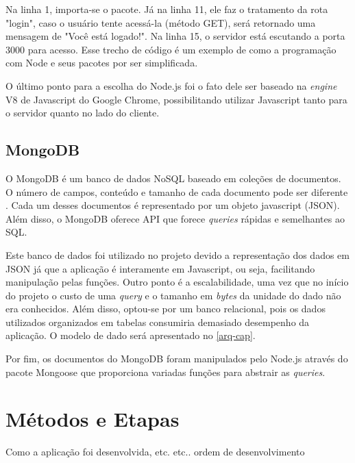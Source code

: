 Na linha 1, importa-se o pacote. Já na linha 11, ele faz o tratamento da rota "login", caso o usuário tente acessá-la (método GET), será retornado uma mensagem de "Você está logado!". Na linha 15, o servidor está escutando a porta 3000 para acesso. Esse trecho de código é um exemplo de como a programação
com Node e seus pacotes por ser simplificada.

O último ponto para a escolha do Node.js foi o fato dele ser baseado na \emph{engine} V8 de Javascript do Google
Chrome, possibilitando utilizar Javascript tanto para o servidor quanto no lado do cliente.

\subsection{MongoDB}
O MongoDB é um banco de dados NoSQL baseado em coleções de documentos. O número de campos, conteúdo e tamanho de cada documento pode ser
diferente \cite{mongo}. Cada um desses documentos é representado por um objeto javascript (JSON). Além disso, o MongoDB oferece API que forece \emph{queries} rápidas e semelhantes ao SQL.

Este banco de dados foi utilizado no projeto devido a representação dos dados em
JSON já que a aplicação é interamente em Javascript, ou seja, facilitando
manipulação pelas funções. Outro ponto é a escalabilidade, uma vez que no início
do projeto o custo de uma \emph{query} e o tamanho em \emph{bytes} da unidade do
dado não era conhecidos. Além disso, optou-se por um banco relacional, pois os dados utilizados organizados em tabelas
consumiria demasiado desempenho da aplicação. O modelo de dado será apresentado no \autoref{arq-cap}.

Por fim, os documentos do MongoDB foram manipulados pelo Node.js através do pacote Mongoose que proporciona variadas
funções para abstrair as \emph{queries}.

\section{Métodos e Etapas}
Como a aplicação foi desenvolvida, etc. etc.. ordem de desenvolvimento
